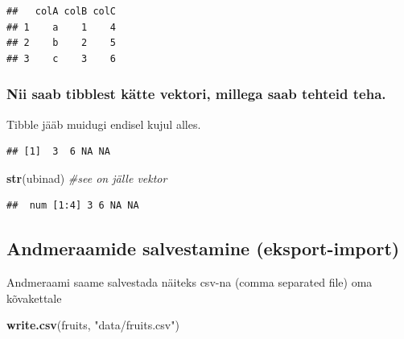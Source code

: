 \documentclass[]{book}
\newenvironment{Shaded}{\begin{snugshade}}{\end{snugshade}}
\newcommand{\KeywordTok}[1]{\textcolor[rgb]{0.13,0.29,0.53}{\textbf{#1}}}
\newcommand{\DecValTok}[1]{\textcolor[rgb]{0.00,0.00,0.81}{#1}}
\newcommand{\StringTok}[1]{\textcolor[rgb]{0.31,0.60,0.02}{#1}}
\newcommand{\CommentTok}[1]{\textcolor[rgb]{0.56,0.35,0.01}{\textit{#1}}}
\newcommand{\OperatorTok}[1]{\textcolor[rgb]{0.81,0.36,0.00}{\textbf{#1}}}
\newcommand{\NormalTok}[1]{#1}
\begin{document}
\begin{verbatim}
##   colA colB colC
## 1    a    1    4
## 2    b    2    5
## 3    c    3    6
\end{verbatim}

\subsubsection{Nii saab tibblest kätte vektori, millega saab tehteid
teha.}\label{nii-saab-tibblest-katte-vektori-millega-saab-tehteid-teha.}

Tibble jääb muidugi endisel kujul alles.

\begin{Shaded}
\end{Shaded}

\begin{verbatim}
## [1]  3  6 NA NA
\end{verbatim}

\begin{Shaded}
\begin{Highlighting}[]
\KeywordTok{str}\NormalTok{(ubinad) }\CommentTok{#see on jälle vektor}
\end{Highlighting}
\end{Shaded}

\begin{verbatim}
##  num [1:4] 3 6 NA NA
\end{verbatim}

\subsection{Andmeraamide salvestamine
(eksport-import)}\label{andmeraamide-salvestamine-eksport-import}

Andmeraami saame salvestada näiteks csv-na (comma separated file) oma
kõvakettale

\begin{Shaded}
\begin{Highlighting}[]
\KeywordTok{write.csv}\NormalTok{(fruits, }\StringTok{"data/fruits.csv"}\NormalTok{)}
\end{Highlighting}
\end{Shaded}
\end{document}
